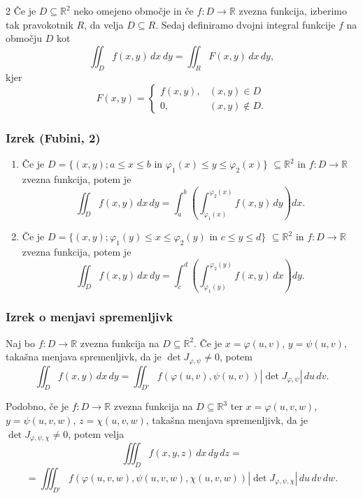 \documentclass{article}
\begin{document}
\begin{multicols}{2}
	Če je \( D \subseteq \mathbb{R}^2 \) neko omejeno območje in če \( f: D \rightarrow \mathbb{R} \) zvezna funkcija, izberimo tak pravokotnik \( R \), da velja \( D \subseteq R \). Sedaj definiramo dvojni integral funkcije \( f \) na območju \( D \) kot
	\[
		\iint_D f(x,y) \,dx\,dy = \iint_R F(x,y) \,dx\,dy,
	\]
	kjer
	\[
		F(x,y) = \begin{cases}
			f(x,y), & (x,y) \in D      \\
			0,      & (x,y) \not\in D.
		\end{cases}
	\]

	\subsubsection{Izrek (Fubini, 2)}
	\begin{enumerate}
		\item Če je \( D = \{(x,y); a \leq x \leq b \text{ in } \varphi_1(x) \leq y \leq \varphi_2(x)\} \) \( \subseteq \mathbb{R}^2 \) in \( f: D \rightarrow \mathbb{R} \) zvezna funkcija, potem je
		      \[
			      \iint_D f(x,y) \,dx\,dy = \int_a^b \left( \int_{\varphi_1(x)}^{\varphi_2(x)} f(x,y) \,dy \right) dx.
		      \]

		\item Če je \( D = \{(x,y); \varphi_1(y) \leq x \leq \varphi_2(y) \text{ in } c \leq y \leq d\} \) \( \subseteq \mathbb{R}^2 \) in \( f: D \rightarrow \mathbb{R} \) zvezna funkcija, potem je
		      \[
			      \iint_D f(x,y) \,dx\,dy = \int_c^d \left( \int_{\varphi_1(y)}^{\varphi_2(y)} f(x,y) \,dx \right) dy.
		      \]
	\end{enumerate}

	\subsubsection{Izrek o menjavi spremenljivk}
	Naj bo \( f: D \rightarrow \mathbb{R} \) zvezna funkcija na \( D \subseteq \mathbb{R}^2 \). Če je \( x = \varphi(u, v) \), \( y = \psi(u, v) \), takašna menjava spremenljivk, da je \( \det J_{\varphi,\psi} \neq 0 \), potem
	\[
		\iint_D f(x, y) \,dx\,dy = \iint_{D'} f(\varphi(u, v), \psi(u, v)) \left| \det J_{\varphi,\psi} \right| \,du\,dv.
	\]

	Podobno, če je \( f: D \rightarrow \mathbb{R} \) zvezna funkcija na \( D \subseteq \mathbb{R}^3 \) ter \( x = \varphi(u, v, w) \), \( y = \psi(u, v, w) \), \( z = \chi(u, v, w) \), takašna menjava spremenljivk, da je \( \det J_{\varphi,\psi,\chi} \neq 0 \), potem velja
	\[
		\iiint_D f(x, y, z) \,dx\,dy\,dz =
	\]
	\[
		= \iiint_{D'} f(\varphi(u, v, w), \psi(u, v, w), \chi(u, v, w)) \left| \det J_{\varphi,\psi,\chi} \right| \,du\,dv\,dw.
	\]


\end{multicols}
\end{document}
